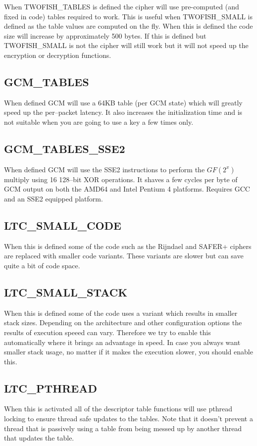 \documentclass[synpaper]{book}
\begin{document}
When TWOFISH\_TABLES is defined the cipher will use pre-computed (and fixed in code) tables required to work.  This is
useful when TWOFISH\_SMALL is defined as the table values are computed on the fly.  When this is defined the code size
will increase by approximately 500 bytes.  If this is defined but TWOFISH\_SMALL is not the cipher will still work but
it will not speed up the encryption or decryption functions.

\subsection{GCM\_TABLES}
When defined GCM will use a 64KB table (per GCM state) which will greatly speed up the per--packet latency.
It also increases the initialization time and is not suitable when you are going to use a key a few times only.

\subsection{GCM\_TABLES\_SSE2}
When defined GCM will use the SSE2 instructions to perform the $GF(2^x)$ multiply using 16 128--bit XOR operations.  It shaves a few cycles per byte
of GCM output on both the AMD64 and Intel Pentium 4 platforms.  Requires GCC and an SSE2 equipped platform.

\subsection{LTC\_SMALL\_CODE}
When this is defined some of the code such as the Rijndael and SAFER+ ciphers are replaced with smaller code variants.
These variants are slower but can save quite a bit of code space.

\subsection{LTC\_SMALL\_STACK}
When this is defined some of the code uses a variant which results in smaller stack sizes.
Depending on the architecture and other configuration options the results of execution speeed can vary.
Therefore we try to enable this automatically where it brings an advantage in speed.
In case you always want smaller stack usage, no matter if it makes the execution slower, you should enable this.

\subsection{LTC\_PTHREAD}
When this is activated all of the descriptor table functions will use pthread locking to ensure thread safe updates to the tables.  Note that
it doesn't prevent a thread that is passively using a table from being messed up by another thread that updates the table.
\end{document}
